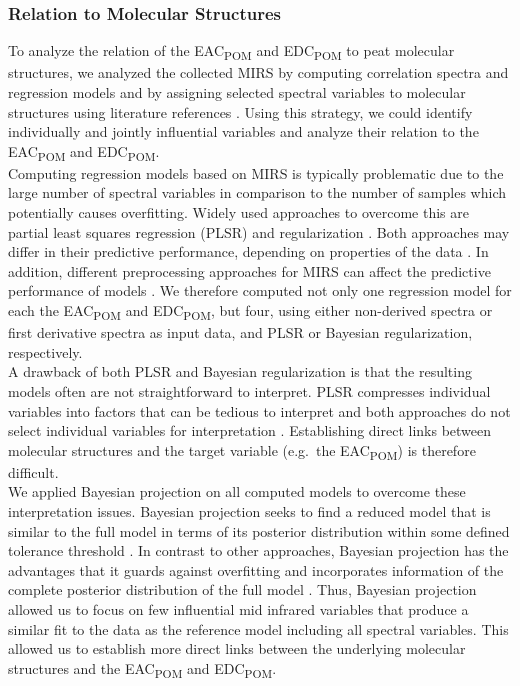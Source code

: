 \documentclass[alpha-refs, lineno]{wiley-article-rmd}
\begin{document}
\hypertarget{relation-to-molecular-structures}{%
\subsubsection{Relation to Molecular Structures}\label{relation-to-molecular-structures}}

To analyze the relation of the EAC\textsubscript{POM} and EDC\textsubscript{POM} to peat molecular structures, we analyzed the collected MIRS by computing correlation spectra and regression models and by assigning selected spectral variables to molecular structures using literature references \autocite{Cocozza.2003,Stuart.2005,Kubo.2005,Schmidt.2006,Artz.2008}. Using this strategy, we could identify individually and jointly influential variables and analyze their relation to the EAC\textsubscript{POM} and EDC\textsubscript{POM}.\\
Computing regression models based on MIRS is typically problematic due to the large number of spectral variables in comparison to the number of samples which potentially causes overfitting. Widely used approaches to overcome this are partial least squares regression (PLSR) and regularization \autocites[e.g.~][]{Artz.2008}{Ferragina.2015}. Both approaches may differ in their predictive performance, depending on properties of the data \autocite{Ferragina.2015}. In addition, different preprocessing approaches for MIRS can affect the predictive performance of models \autocite{Engel.2013}. We therefore computed not only one regression model for each the EAC\textsubscript{POM} and EDC\textsubscript{POM}, but four, using either non-derived spectra or first derivative spectra as input data, and PLSR or Bayesian regularization, respectively.\\
A drawback of both PLSR and Bayesian regularization is that the resulting models often are not straightforward to interpret. PLSR compresses individual variables into factors that can be tedious to interpret and both approaches do not select individual variables for interpretation \autocite{Yun.2019,Piironen.2020}. Establishing direct links between molecular structures and the target variable (e.g.~the EAC\textsubscript{POM}) is therefore difficult.\\
We applied Bayesian projection \autocite{Piironen.2020} on all computed models to overcome these interpretation issues. Bayesian projection seeks to find a reduced model that is similar to the full model in terms of its posterior distribution within some defined tolerance threshold \autocite{Piironen.2020}. In contrast to other approaches, Bayesian projection has the advantages that it guards against overfitting and incorporates information of the complete posterior distribution of the full model \autocite{Piironen.2017,Piironen.2020}. Thus, Bayesian projection allowed us to focus on few influential mid infrared variables that produce a similar fit to the data as the reference model including all spectral variables. This allowed us to establish more direct links between the underlying molecular structures and the EAC\textsubscript{POM} and EDC\textsubscript{POM}.\\
\end{document}
